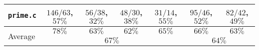 \begin{tabular}{ |l| |c|c|c|c| |c|c| }
  \\\hline
  \verb|prime.c|
  & \hspace{.5em}$  146/63$,\hspace{.5em}$57\%$ & \hspace{.5em}$  56/38$,\hspace{.5em}$32\%$ & \hspace{1em}$   48/30$,\hspace{.5em}$38\%$ & \hspace{1em}$   31/14$,\hspace{.5em}$55\%$
& \hspace{1em}$95/46$,     \hspace{.5em}$52\%$ & \hspace{1em}$82/42$,     \hspace{.5em}$49\%$

  \\\hline\hline
  \multirow{2}{*}{Average}
  & \multicolumn{1}{c|}{$78\%$} & \multicolumn{1}{c|}{$63\%$} & \multicolumn{1}{c|}{$62\%$} & \multicolumn{1}{c||}{$65\%$}
  & \multicolumn{1}{c|}{$66\%$} & \multicolumn{1}{c|}{$63\%$}

  \\\cline{2-7}  
  & \multicolumn{4}{c||}{$67\%$}
  & \multicolumn{2}{c|}{$64\%$}
  
  \\\hline
\end{tabular}
